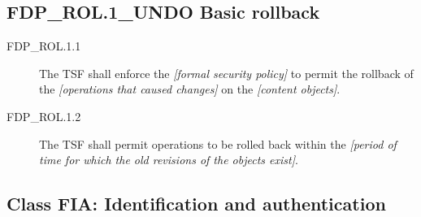 \documentclass[10pt,a4paper,english]{scrbook}
\begin{document}

\hypertarget{fdp-rol-1-undo-basic-rollback}{}
\subsection{FDP{\_}ROL.1{\_}UNDO Basic rollback}
\begin{description}
\item[FDP{\_}ROL.1.1 ]

The TSF shall enforce the \emph{{[}formal security policy]} to permit
the rollback of the \emph{{[}operations that caused changes]} on the \emph{{[}content
objects]}.

\item[FDP{\_}ROL.1.2 ]

The TSF shall permit operations to be rolled back
within the \emph{{[}period of time for which the old revisions of the objects
exist]}.

\end{description}



\hypertarget{class-fia-identification-and-authentication}{}
\subsection{Class FIA: Identification and authentication}



\hypertarget{fia-afl-z-1-authentication-failure-handling}{}
\end{document}
